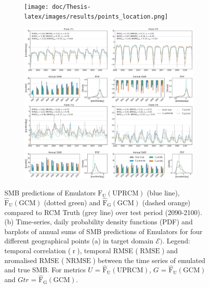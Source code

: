 \documentclass[a4paper,11pt,oneside]{report}
\begin{document}
\begin{figure}[tbp]
        \centering
        \begin{subfigure}[b]{0.2\columnwidth}
            \centering \texttt{[image: doc/Thesis-latex/images/results/points\_location.png]}
            \caption[]%
            {{\small}}    
          \label{fig:points-location}
        \end{subfigure}
        \hfill
        \begin{subfigure}[b]{\columnwidth}  
            \centering 
           \includegraphics[width=\textwidth]{doc/Thesis-latex/images/results/timeseries_RCM_GCM.pdf}
            \caption[]%
            {{\small }}  
          \label{fig:timeseries-GCM-UPRCM}
        \end{subfigure}
        \hfill
        \caption[]
        {\small SMB predictions of Emulators $\mathrm{\hat{F}_{U}(UPRCM)}$ (blue line), $\mathrm{\hat{F}_{U}(GCM)}$ (dotted green) and $\mathrm{\mathrm{\hat{F}_{G}(GCM)}}$ (dashed orange) compared to RCM Truth (grey line) over test period (2090-2100). 
        (b) Time-series, daily probability density functions (PDF) and barplots of annual sums of SMB predictions of Emulators for four different geographical points (a) in target domain $\mathcal{E})$.
        Legend: temporal correlation ($\operatorname{r}$), temporal RMSE ($\operatorname{RMSE}$) and nromalised RMSE ($\operatorname{NRMSE}$) between the time series of emulated and true SMB. For metrics $U$ = $\mathrm{\hat{F}_{U}(UPRCM)}$, $G$ = $\mathrm{\hat{F}_{U}(GCM)}$ and $Gtr$ = $\mathrm{\hat{F}_{G}(GCM)}$.} 
        \label{fig:points-timeseries-GCM-UPRCM}
    \end{figure}
\end{document}
